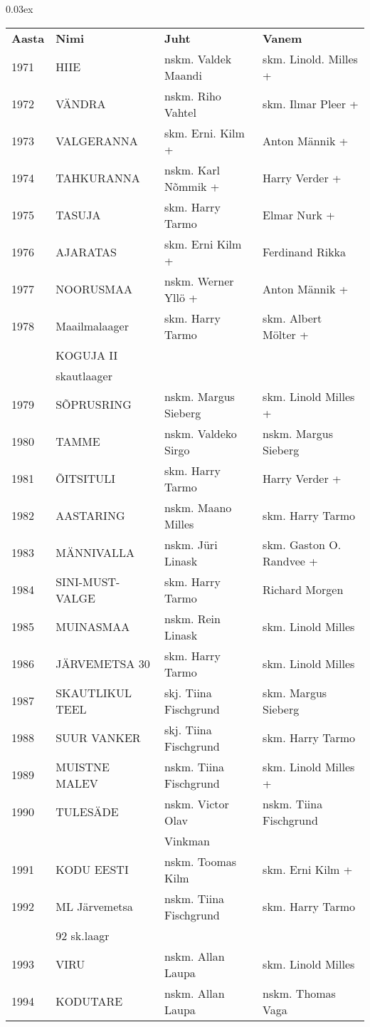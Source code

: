 \documentclass[12pt]{extbook}
\begin{document}
{\centering\scriptsize\arrayrulewidth 0.03ex
\begin{tabular*}{1.0\textwidth}{@{\extracolsep{\fill}}@{}l@{}@{}l@{}@{}l@{}@{}l@{}}
\bf{Aasta}	&	\bf{Nimi}				&	\bf{Juht}				&	\bf{Vanem}\\[2mm]
	1971	&	HIIE					&	nskm. Valdek Maandi		&	skm. Linold. Milles +\\[2mm]
	1972	&	V\"ANDRA				&	nskm. Riho Vahtel		&	skm. Ilmar Pleer +\\[2mm]
	1973	&	VALGERANNA				&	skm. Erni. Kilm +		&	Anton M\"annik +\\[2mm]
	1974	&	TAHKURANNA				&	nskm. Karl N\~ommik +	&	Harry Verder +\\[2mm]
	1975	&	TASUJA					&	skm. Harry Tarmo		&	Elmar Nurk +\\[2mm]
	1976	&	AJARATAS				&	skm. Erni Kilm +		&	Ferdinand Rikka\\[2mm]
	1977	&	NOORUSMAA				&	nskm. Werner Yll\"o +	&	Anton M\"annik +\\[2mm]
	1978	&	Maailmalaager 			&	skm. Harry Tarmo		&	skm. Albert M\"olter +\\
			&	KOGUJA II 				&							&	\\
			&	skautlaager				&							&	\\[2mm]
	1979	&	S\~OPRUSRING			&	nskm. Margus Sieberg	&	skm. Linold Milles +\\[2mm]
	1980	&	TAMME					&	nskm. Valdeko Sirgo		&	nskm. Margus Sieberg\\[2mm]
	1981	&	\~OITSITULI				&	skm. Harry Tarmo		&	Harry Verder +\\[2mm]
	1982	&	AASTARING				&	nskm. Maano Milles		&	skm. Harry Tarmo\\[2mm]
	1983	&	M\"ANNIVALLA			&	nskm. J\"uri Linask		&	skm. Gaston O. Randvee +\\[2mm]
	1984	&	SINI-MUST-VALGE			&	skm. Harry Tarmo		&	Richard Morgen\\[2mm]
	1985	&	MUINASMAA				&	nskm. Rein Linask		&	skm. Linold Milles\\[2mm]
	1986	&	J\"ARVEMETSA 30			&	skm. Harry Tarmo		&	skm. Linold Milles\\[2mm]
	1987	&	SKAUTLIKUL TEEL			&	skj. Tiina Fischgrund	&	skm. Margus Sieberg\\[2mm]
	1988	&	SUUR VANKER				&	skj. Tiina Fischgrund	&	skm. Harry Tarmo\\[2mm]
	1989	&	MUISTNE MALEV			&	nskm. Tiina Fischgrund	&	skm. Linold Milles +\\[2mm]
	1990	&	TULES\"ADE				&	nskm. Victor Olav 		&	nskm.   Tiina Fischgrund\\
			&							&	Vinkman					&	\\[2mm]
	1991	&	KODU EESTI				&	nskm. Toomas Kilm		&	skm. Erni Kilm +\\[2mm]
	1992	&	ML J\"arvemetsa  		&	nskm. Tiina Fischgrund	&	skm. Harry Tarmo\\
			&	92 sk.laagr				&							&	\\[2mm]
	1993	&	VIRU					&	nskm. Allan Laupa		&	skm. Linold Milles\\[2mm]
	1994	&	KODUTARE				&	nskm. Allan Laupa		&	nskm. Thomas Vaga\\[2mm]
\end{tabular*}}
\end{document}
